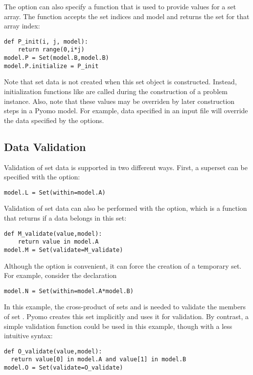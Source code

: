 The  option can also specify a function that is used to provide values for a set array.  The function accepts the set indices and model and returns the set for that array index:
\begin{lstlisting}
def P_init(i, j, model):
    return range(0,i*j)
model.P = Set(model.B,model.B)
model.P.initialize = P_init
\end{lstlisting}

Note that set data is not created when this set object is constructed.
Instead, initialization functions like  are called during
the construction of a problem instance.
Also, note that these values may be overriden by later construction
steps in a Pyomo model.  For example, data specified in an input file
will override the data specified by the  options.


\subsection{Data Validation}

Validation of set data is supported in two different ways.  First, a
superset can be specified with the  option:
\begin{lstlisting}
model.L = Set(within=model.A)
\end{lstlisting}
Validation of set data can also be performed with the  option,
which is a function that returns  if a data belongs in this set:
\begin{lstlisting}
def M_validate(value,model):
    return value in model.A
model.M = Set(validate=M_validate)
\end{lstlisting}
Although the  option is convenient, it can force the creation of
a temporary set.  For example, consider the declaration
\begin{lstlisting}
model.N = Set(within=model.A*model.B)
\end{lstlisting}
In this example, the cross-product of sets  and  is needed to validate
the members of set .  Pyomo creates this set implicitly and uses
it for validation.  By contrast, a simple validation function could be used
in this example, though with a less intuitive syntax:
\begin{lstlisting}
def O_validate(value,model):
  return value[0] in model.A and value[1] in model.B
model.O = Set(validate=O_validate)
\end{lstlisting}

